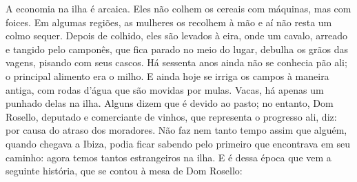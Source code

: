 A economia na ilha é arcaica. Eles não colhem os cereais com máquinas,
mas com foices. Em algumas regiões, as mulheres os recolhem à mão e aí
não resta um colmo sequer. Depois de colhido, eles são levados à eira,
onde um cavalo, arreado e tangido pelo camponês, que fica parado no meio
do lugar, debulha os grãos das vagens, pisando com seus cascos. Há
sessenta anos ainda não se conhecia pão ali; o principal alimento era o
milho. E ainda hoje se irriga os campos à maneira antiga, com rodas
d'água que são movidas por mulas. Vacas, há apenas um punhado delas na
ilha. Alguns dizem que é devido ao pasto; no entanto, Dom Rosello,
deputado e comerciante de vinhos, que representa o progresso ali, diz:
por causa do atraso dos moradores. Não faz nem tanto tempo assim que
alguém, quando chegava a Ibiza, podia ficar sabendo pelo primeiro que
encontrava em seu caminho: agora temos tantos estrangeiros na ilha. E é
dessa época que vem a seguinte história, que se contou à mesa de Dom
Rosello:

